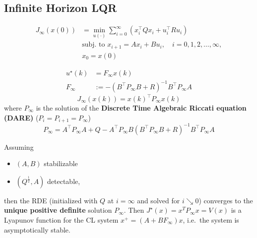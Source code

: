 \subsection{Infinite Horizon LQR}

\noindent
\begin{align*}
    J_\infty(x(0)) & =\min_{u(\cdot)}\sum_{i=0}^\infty\left(x_i^\top Qx_i+u_i^\top Ru_i\right) \\
                   & \text{subj.\ to }x_{i+1}=Ax_i+Bu_i,\quad i=0,1,2,\dots,\infty,            \\
                   & x_0=x(0)
\end{align*}

\newpar{}
\noindent
\begin{align*}
    u^\star(k) & = F_\infty x(k)                                   \\
    F_\infty   & := -{(B^\top P_\infty B+R)}^{-1}B^\top P_\infty A
\end{align*}
\begin{equation*}
    J_\infty(x(k))={x(k)}^\top P_\infty x(k)
\end{equation*}
where $P_\infty$ is the solution of the \textbf{Discrete Time Algebraic Riccati equation (DARE)} ($P_i = P_{i+1} = P_{\infty}$)
\begin{equation*}
    P_\infty=A^\top P_\infty A+Q-A^\top P_\infty B{(B^\top P_\infty B+R)}^{-1}B^\top P_\infty A
\end{equation*}


Assuming
\begin{itemize}
    \item $(A,B)$ stabilizable
    \item $(Q^{\frac{1}{2}}, A)$ detectable,
\end{itemize}
then the RDE (initialized with $Q$ at $i = \infty$ and solved for $i\searrow 0$) converges to the \textbf{unique positive definite} solution $P_{\infty}$.
\newpar{}
Then $J^{\star} (x) = x^T P_{\infty} x = V(x)$ is a Lyapunov function for the CL system $x^+ = (A + BF_{\infty} )x$, i.e.\ the system is asymptotically stable.
